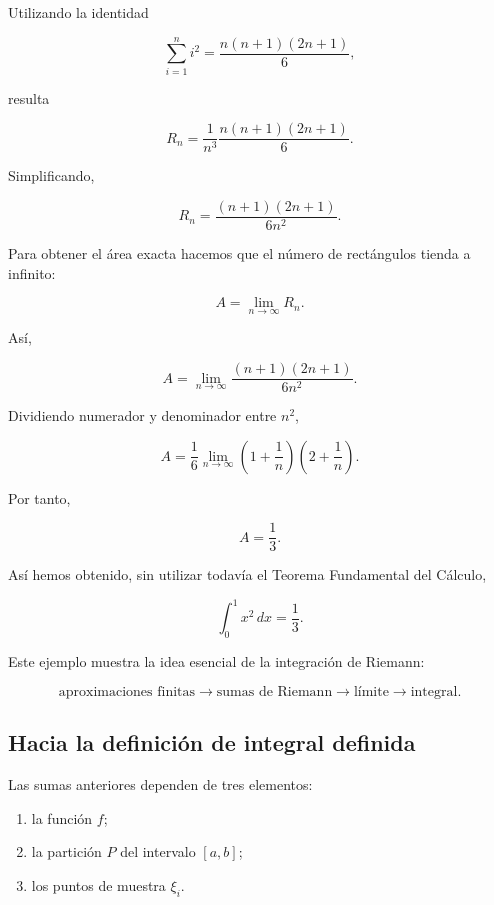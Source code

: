 \documentclass[12pt]{article}
\begin{document}
Utilizando la identidad

\[
\sum_{i=1}^{n}i^2
=
\frac{n(n+1)(2n+1)}{6},
\]

resulta

\[
R_n
=
\frac{1}{n^3}
\frac{n(n+1)(2n+1)}{6}.
\]

Simplificando,

\[
R_n
=
\frac{(n+1)(2n+1)}{6n^2}.
\]

Para obtener el área exacta hacemos que el número de rectángulos tienda
a infinito:

\[
A
=
\lim_{n\to\infty}R_n.
\]

Así,

\[
A
=
\lim_{n\to\infty}
\frac{(n+1)(2n+1)}{6n^2}.
\]

Dividiendo numerador y denominador entre $n^2$,

\[
A
=
\frac{1}{6}
\lim_{n\to\infty}
\left(1+\frac{1}{n}\right)
\left(2+\frac{1}{n}\right).
\]

Por tanto,

\[
\boxed{
A=\frac{1}{3}.
}
\]

Así hemos obtenido, sin utilizar todavía el Teorema Fundamental del
Cálculo,

\[
\int_0^1x^2\,dx=\frac{1}{3}.
\]

Este ejemplo muestra la idea esencial de la integración de Riemann:

\[
\boxed{
\text{aproximaciones finitas}
\longrightarrow
\text{sumas de Riemann}
\longrightarrow
\text{límite}
\longrightarrow
\text{integral}.
}
\]

\subsection{Hacia la definición de integral definida}

Las sumas anteriores dependen de tres elementos:

\begin{enumerate}

    \item la función $f$;

    \item la partición $P$ del intervalo $[a,b]$;

    \item los puntos de muestra $\xi_i$.

\end{enumerate}
\end{document}
